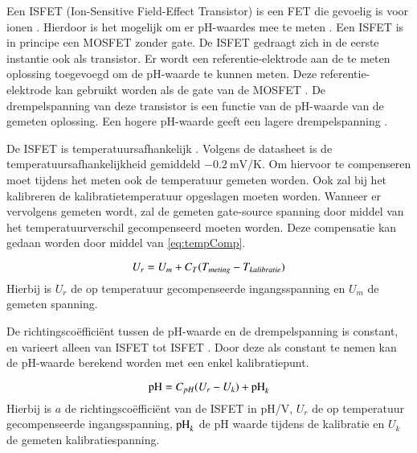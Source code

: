 Een ISFET (Ion-Sensitive Field-Effect Transistor) is een FET die gevoelig is voor ionen \cite{isfetAsAnElectronicDevice}. Hierdoor is het mogelijk om er pH-waardes mee te meten \cite{modeling,isfetAsAnElectronicDevice}. Een ISFET is in principe een MOSFET zonder gate. De ISFET gedraagt zich in de eerste instantie ook als transistor. Er wordt een referentie-elektrode aan de te meten oplossing toegevoegd om de pH-waarde te kunnen meten. Deze referentie-elektrode kan gebruikt worden als de gate van de MOSFET \cite{van1987isfet,isfetAsAnElectronicDevice}. De drempelspanning van deze transistor is een functie van de pH-waarde van de gemeten oplossing. Een hogere pH-waarde geeft een lagere drempelspanning \cite{isfet,isfetAsAnElectronicDevice}.

De ISFET is temperatuursafhankelijk \cite{isfet,isfetAsAnElectronicDevice}. Volgens de datasheet is de temperatuursafhankelijkheid gemiddeld $\qty{-0.2}{\milli\volt\per\kelvin}$\cite{Microsens-MSFET}. Om hiervoor te compenseren moet tijdens het meten ook de temperatuur gemeten worden. Ook zal bij het kalibreren de kalibratietemperatuur opgeslagen moeten worden. Wanneer er vervolgens gemeten wordt, zal de gemeten gate-source spanning door middel van het temperatuurverschil gecompenseerd moeten worden. Deze compensatie kan gedaan worden door middel van \cref{eq:tempComp}.

\begin{equation}\label{eq:tempComp}
    U_r = U_m + C_T(T_{meting} - T_{kalibratie})
    \tagaddtext{[\si{\volt}]}
\end{equation}
Hierbij is $U_r$ de op temperatuur gecompenseerde ingangsspanning en $U_m$ de gemeten spanning.

De richtingscoëfficiënt tussen de pH-waarde en de drempelspanning is constant, en varieert alleen van ISFET tot ISFET \cite{Microsens-MSFET}. Door deze als constant te nemen kan de pH-waarde berekend worden met een enkel kalibratiepunt.

\begin{equation}\label{eq:calcPH}
    \ph = C_{pH}(U_r - U_k) + \ph_k
    \tagaddtext{[pH]}
\end{equation}
Hierbij is $a$ de richtingscoëfficiënt van de ISFET in pH/V, $U_r$ de op temperatuur gecompenseerde ingangsspanning, $\mathrm{pH}_k$ de pH waarde tijdens de kalibratie en $U_k$ de gemeten kalibratiespanning.